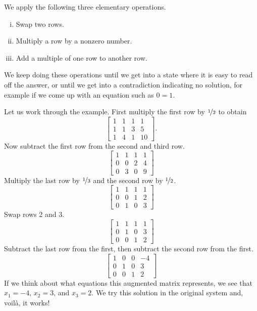\pagebreak[2]
We apply the following three elementary operations.
\begin{enumerate}[(i)]
\item Swap two rows.
\item Multiply a row by a nonzero number.
\item Add a multiple of one row to another row.
\end{enumerate}
We keep doing these operations until we get into a state where it is
easy to read off the answer, or until we get into a contradiction indicating
no solution, for example if we come up with an equation such as $0=1$.

Let us work through the example.  First multiply the first row by
$\nicefrac{1}{2}$ to obtain
\begin{equation*}
\left[
\begin{array}{ccc|c}
1 & 1 & 1 & 1 \\
1 & 1 & 3 & 5 \\
1 & 4 & 1 & 10
\end{array}
\right] .
\end{equation*}
Now subtract the first row from the second and third row.
\begin{equation*}
\left[
\begin{array}{ccc|c}
1 & 1 & 1 & 1 \\
0 & 0 & 2 & 4 \\
0 & 3 & 0 & 9
\end{array}
\right]
\end{equation*}
Multiply the last row by $\nicefrac{1}{3}$ and the second row by $\nicefrac{1}{2}$.
\begin{equation*}
\left[
\begin{array}{ccc|c}
1 & 1 & 1 & 1 \\
0 & 0 & 1 & 2 \\
0 & 1 & 0 & 3
\end{array}
\right]
\end{equation*}
Swap rows 2 and 3.
\begin{equation*}
\left[
\begin{array}{ccc|c}
1 & 1 & 1 & 1 \\
0 & 1 & 0 & 3 \\
0 & 0 & 1 & 2
\end{array}
\right]
\end{equation*}
Subtract the last row from the first, then subtract the second row
from the first.
\begin{equation*}
\left[
\begin{array}{ccc|c}
1 & 0 & 0 & -4 \\
0 & 1 & 0 & 3 \\
0 & 0 & 1 & 2
\end{array}
\right]
\end{equation*}
If we think about what equations this augmented matrix represents, we see that
$x_1 = -4$, $x_2 = 3$, and $x_3 = 2$.  We try this solution in the original
system and, voil\`a, it works!

